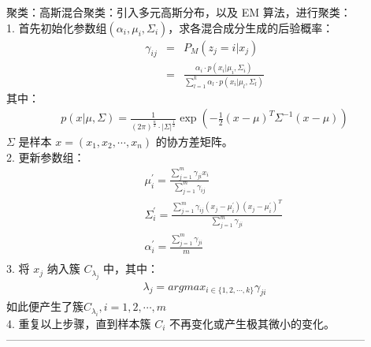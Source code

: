 \documentclass{article}
\begin{document}
\noindent 聚类：高斯混合聚类：引入多元高斯分布，以及 EM 算法，进行聚类：\\
1. 首先初始化参数组$(\alpha_{i}, \mu_{i}, \Sigma_{i})$，求各混合成分生成的后验概率：
\begin{eqnarray*}
\gamma_{ij}&=&P_{M}(z_{j}=i|x_{j})\\
&=&\frac{\alpha_{i}\cdot p(x_{i}|\mu_{i},\Sigma_{i})}{\sum_{l=1}^{k}\alpha_{l}\cdot p(x_{i}|\mu_{l},\Sigma_{l})} 
\end{eqnarray*}
其中：
\begin{eqnarray*}
p(x|\mu, \Sigma) = \frac{1}{(2\pi)^{\frac{n}{2}}\cdot |\Sigma|^{\frac{1}{2}}}\exp{(-\frac{1}{2}(x-\mu)^{T}\Sigma^{-1}(x-\mu))}
\end{eqnarray*}
$\Sigma$ 是样本 $x=(x_{1}, x_{2}, \cdots, x_{n})$ 的协方差矩阵。\\
2. 更新参数组：
\begin{eqnarray*}
&&\mu_{i}^{'}=\frac{\sum_{j=1}^{m}\gamma_{ji}x_{i}}{\sum_{j=1}^{m}\gamma_{ij}}\\
&&\Sigma_{i}^{'} = \frac{\sum_{j=1}^{m}\gamma_{ij}(x_{j}-\mu_{i}^{'})(x_{j}-\mu_{i}^{'})^{T}}{\sum_{j=1}^{m}\gamma_{ji}}\\
&&\alpha_{i}^{'}=\frac{\sum_{j=1}^{m}\gamma_{ji}}{m}\\
\end{eqnarray*}
3. 将 $x_{j}$ 纳入簇 $C_{\lambda_{j}}$ 中，其中：
\begin{eqnarray*}
\lambda_{j}= argmax_{i\in\{1,2,\cdots, k\}}\gamma_{ji}
\end{eqnarray*}
如此便产生了簇$C_{\lambda_{i}},i=1,2,\cdots, m$\\
4. 重复以上步骤，直到样本簇 $C_{i}$ 不再变化或产生极其微小的变化。\\
--------------------------------------------------------------------------------------------------\\
\end{document}
